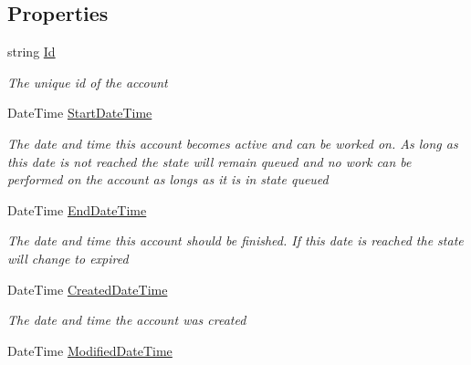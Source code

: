 \subsection*{Properties}
\begin{DoxyCompactItemize}
\item 
string \hyperlink{class_plex_byte_1_1_mo_cap_1_1_interactions_1_1_account_a803b3019d6baa78793eeb56e9033028a}{Id}
\begin{DoxyCompactList}\small\item\em The unique id of the account \end{DoxyCompactList}\item 
Date\+Time \hyperlink{class_plex_byte_1_1_mo_cap_1_1_interactions_1_1_account_a5e26981bffb5bdee06beb50888553ec0}{Start\+Date\+Time}
\begin{DoxyCompactList}\small\item\em The date and time this account becomes active and can be worked on. As long as this date is not reached the state will remain queued and no work can be performed on the account as longs as it is in state queued \end{DoxyCompactList}\item 
Date\+Time \hyperlink{class_plex_byte_1_1_mo_cap_1_1_interactions_1_1_account_a15dfe505b42a142c4a4fc0ec93ab7fba}{End\+Date\+Time}
\begin{DoxyCompactList}\small\item\em The date and time this account should be finished. If this date is reached the state will change to expired \end{DoxyCompactList}\item 
Date\+Time \hyperlink{class_plex_byte_1_1_mo_cap_1_1_interactions_1_1_account_a5479e6c738ee5788378895820d71e24a}{Created\+Date\+Time}
\begin{DoxyCompactList}\small\item\em The date and time the account was created \end{DoxyCompactList}\item 
Date\+Time \hyperlink{class_plex_byte_1_1_mo_cap_1_1_interactions_1_1_account_af8af891d5ca86bc5aec5403339aefa76}{Modified\+Date\+Time}

\end{DoxyCompactItemize}
